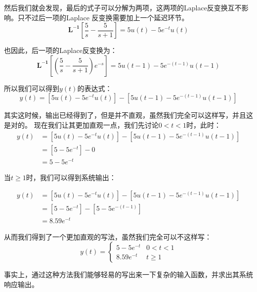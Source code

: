\documentclass{ctexart}
\begin{document}
然后我们就会发现，最后的式子可以分解为两项，这两项的Laplace反变换互不影响。只不过后一项的Laplace
反变换需要加上一个延迟环节。
\begin{equation}
    \mathbf{L^{-1}}[\frac{5}{s} - \frac{5}{s+1}] = 5u(t) - 5e^{-t}u(t)
\end{equation}

也因此，后一项的Laplace反变换为：
\begin{equation}
    \mathbf{L^{-1}}[(\frac{5}{s} - \frac{5}{s+1}) e^{-s}] = 5u(t-1) - 5e^{-(t-1)}u(t-1)
\end{equation}

所以我们可以得到$y(t)$的表达式：
\begin{equation}
    y(t) = [5u(t) - 5e^{-t}u(t)] - [5u(t-1) - 5e^{-(t-1)}u(t-1)]
\end{equation}

其实这时候，输出已经得到了，但是并不直观，虽然我们完全可以这样写，并且这是对的。
现在我们让其更加直观一点，我们先讨论$0<t<1$时，此时：
\begin{equation}
    \begin{aligned}
        y(t) & = [5u(t) - 5e^{-t}u(t)] - [5u(t-1) - 5e^{-(t-1)}u(t-1)] \\
             & = [5 - 5e^{-t}] - 0                                     \\
             & = 5 - 5 e^{-t}
    \end{aligned}
\end{equation}

当$t\geq1$时，我们可以得到系统输出：

\begin{equation}
    \begin{aligned}
        y(t) & = [5u(t) - 5e^{-t}u(t)] - [5u(t-1) - 5e^{-(t-1)}u(t-1)] \\
             & = [5 - 5e^{-t}] - [5 - 5e^{-(t-1)}]                     \\
             & = 8.59 e^{-t}
    \end{aligned}
\end{equation}

从而我们得到了一个更加直观的写法，虽然我们完全可以不这样写：
\begin{equation}
    y(t) = \begin{cases}
        5 - 5 e^{-t} & 0<t<1   \\
        8.59 e^{-t}  & t\geq 1
    \end{cases}
\end{equation}

事实上，通过这种方法我们能够轻易的写出来一下复杂的输入函数，并求出其系统响应输出。
\end{document}
